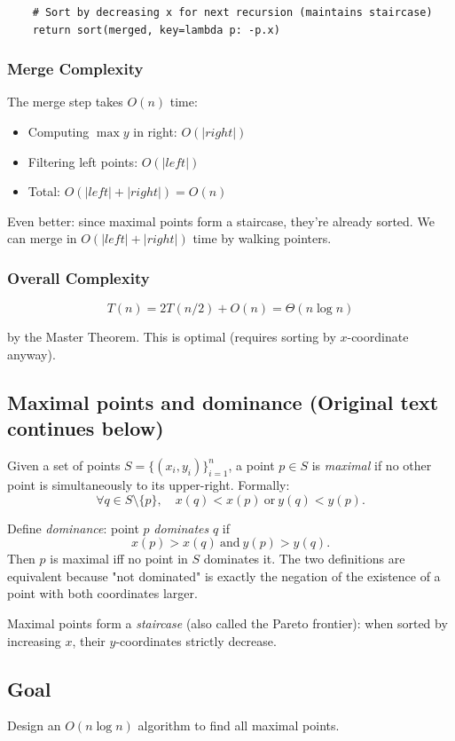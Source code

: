 \documentclass[11pt]{article}
\begin{document}
{\begin{lstlisting}
    # Sort by decreasing x for next recursion (maintains staircase)
    return sort(merged, key=lambda p: -p.x)
\end{lstlisting}

\subsubsection*{Merge Complexity}
The merge step takes $O(n)$ time:
\begin{itemize}
\item Computing $\max y$ in right: $O(|right|)$
\item Filtering left points: $O(|left|)$
\item Total: $O(|left| + |right|) = O(n)$
\end{itemize}

Even better: since maximal points form a staircase, they're already sorted. We can merge in $O(|left| + |right|)$ time by walking pointers.

\subsubsection*{Overall Complexity}
\[
T(n) = 2T(n/2) + O(n) = \Theta(n \log n)
\]

by the Master Theorem. This is optimal (requires sorting by $x$-coordinate anyway).

\subsection*{Maximal points and dominance (Original text continues below)}
Given a set of points $S = \{(x_i, y_i)\}_{i=1}^n$, a point $p \in S$ is \emph{maximal} if no other
point is simultaneously to its upper-right. Formally:
\[
\forall q \in S \setminus \{p\},\quad x(q) < x(p)\ \text{or}\ y(q) < y(p).
\]

Define \emph{dominance}: point $p$ \emph{dominates} $q$ if
\[
x(p) > x(q)\ \text{and}\ y(p) > y(q).
\]
Then $p$ is maximal iff no point in $S$ dominates it. The two definitions are equivalent because
"not dominated" is exactly the negation of the existence of a point with both coordinates larger.

Maximal points form a \emph{staircase} (also called the Pareto frontier): when sorted by increasing
$x$, their $y$-coordinates strictly decrease.

\subsection*{Goal}
Design an $O(n \log n)$ algorithm to find all maximal points.

}
\end{document}
